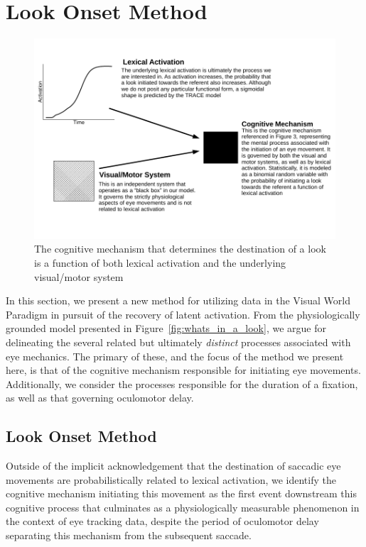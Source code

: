 \documentclass{article}
\begin{document}
\section{Look Onset Method}

\begin{figure}[H]
\centering
\includegraphics[scale=1]{black_box_system.pdf}
\caption{The cognitive mechanism that determines the destination of a look is a function of both lexical activation and the underlying visual/motor system}
\label{fig:black_box_model}
\end{figure}


In this section, we present a new method for utilizing data in the Visual World Paradigm in pursuit of the recovery of latent activation. From the physiologically grounded model presented in Figure~\ref{fig:whats_in_a_look}, we argue for delineating the several related but ultimately \emph{distinct} processes associated with eye mechanics. The primary of these, and the focus of the method we present here, is that of the cognitive mechanism responsible for initiating eye movements. Additionally, we consider the processes responsible for the duration of a fixation, as well as that governing oculomotor delay.

\subsection{Look Onset Method}

Outside of the implicit acknowledgement that the destination of saccadic eye movements are probabilistically related to lexical activation, we identify the cognitive mechanism initiating this movement as the first event downstream this cognitive process that culminates as a physiologically measurable phenomenon in the context of eye tracking data, despite the period of oculomotor delay separating this mechanism from the subsequent saccade. 
\end{document}

